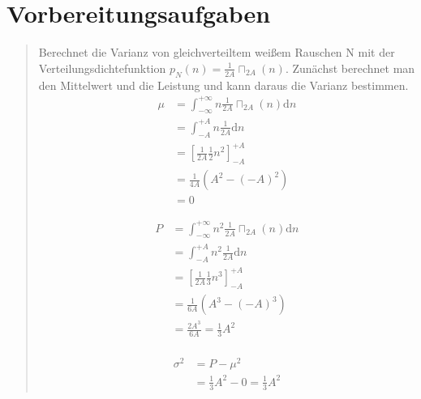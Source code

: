 %     




\section{Vorbereitungsaufgaben}

    \begin{quote}
    Berechnet die Varianz von gleichverteiltem weißem Rauschen N mit der
    Verteilungsdichtefunktion $p_{N}(n)=\frac{1}{2A}\sqcap_{2A}(n)$. Zunächst
    berechnet man den Mittelwert und die Leistung und kann daraus die Varianz
    bestimmen.
    \begin{equation*}
     \begin{split}
     \mu &= \int_{-\infty}^{+\infty} n \frac{1}{2A} \sqcap_{2A} (n) \mathrm dn\\
     &= \int_{-A}^{+A} n \frac{1}{2A} \mathrm dn\\
     &= \left[ \frac{1}{2A} \frac{1}{2} n^2 \right]_{-A}^{+A}\\
     &= \frac{1}{4A} (A^2-(-A)^2)\\
     &= 0
     \end{split}
    \end{equation*}
    
    \begin{equation*}
     \begin{split}
     P &= \int_{-\infty}^{+\infty} n^2 \frac{1}{2A} \sqcap_{2A} (n) \mathrm dn\\
     &= \int_{-A}^{+A} n^2 \frac{1}{2A} \mathrm dn\\
     &= \left[ \frac{1}{2A} \frac{1}{3} n^3 \right]_{-A}^{+A}\\
     &= \frac{1}{6A} (A^3-(-A)^3)\\
            &= \frac{2A^3}{6A} = \frac{1}{3} A^2\\
     \end{split}
    \end{equation*}
    
    \begin{equation*}
     \begin{split}
     \sigma^2 &= P - \mu^2\\
     &= \frac{1}{3} A^2 - 0 = \frac{1}{3} A^2
     \end{split}
    \end{equation*}
\end{quote}



